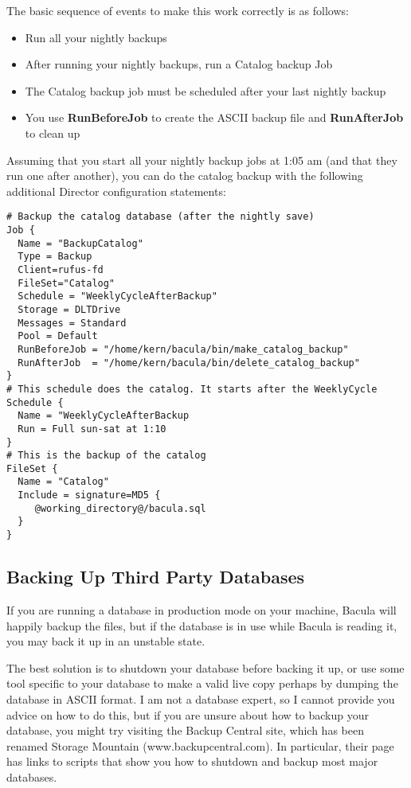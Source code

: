 The basic sequence of events to make this work correctly is as follows: 

\begin{itemize}
\item Run all your nightly backups  
\item After running your nightly backups, run a Catalog backup Job  
\item The Catalog backup job must be scheduled after your last nightly backup 

\item You use {\bf RunBeforeJob} to create the ASCII  backup file and {\bf
   RunAfterJob} to clean up 
   \end{itemize}

Assuming that you start all your nightly backup jobs at 1:05 am (and that they
run one after another), you can do the catalog backup with the following
additional Director configuration statements: 

\footnotesize
\begin{verbatim}
# Backup the catalog database (after the nightly save)
Job {
  Name = "BackupCatalog"
  Type = Backup
  Client=rufus-fd
  FileSet="Catalog"
  Schedule = "WeeklyCycleAfterBackup"
  Storage = DLTDrive
  Messages = Standard
  Pool = Default
  RunBeforeJob = "/home/kern/bacula/bin/make_catalog_backup"
  RunAfterJob  = "/home/kern/bacula/bin/delete_catalog_backup"
}
# This schedule does the catalog. It starts after the WeeklyCycle
Schedule {
  Name = "WeeklyCycleAfterBackup
  Run = Full sun-sat at 1:10
}
# This is the backup of the catalog
FileSet {
  Name = "Catalog"
  Include = signature=MD5 {
     @working_directory@/bacula.sql
  }
}
\end{verbatim}
\normalsize

\label{BackingUPOtherDBs}

\subsection*{Backing Up Third Party Databases}

If you are running a database in production mode on your machine, Bacula will
happily backup the files, but if the database is in use while Bacula is
reading it, you may back it up in an unstable state. 

The best solution is to shutdown your database before backing it up, or use
some tool specific to your database to make a valid live copy perhaps by
dumping the database in ASCII format. I am not a database expert, so I cannot
provide you advice on how to do this, but if you are unsure about how to
backup your database, you might try visiting the Backup Central site, which
has been renamed Storage Mountain (www.backupcentral.com). In particular,
their 
 page has
links to scripts that show you how to shutdown and backup most major
databases. 
\label{Size}

